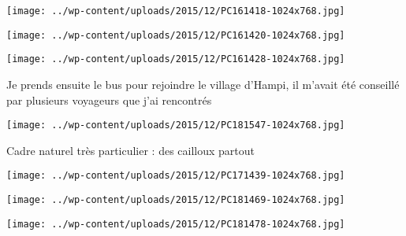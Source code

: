  

 

\begin{center} \texttt{[image: ../wp-content/uploads/2015/12/PC161418-1024x768.jpg]} \end{center}

 

 

\begin{center} \texttt{[image: ../wp-content/uploads/2015/12/PC161420-1024x768.jpg]} \end{center}

 

 

\begin{center} \texttt{[image: ../wp-content/uploads/2015/12/PC161428-1024x768.jpg]} \end{center}

 

 Je prends ensuite le bus pour rejoindre le village d'Hampi, il m'avait été conseillé par plusieurs voyageurs que j'ai rencontrés 

 

\begin{center} \texttt{[image: ../wp-content/uploads/2015/12/PC181547-1024x768.jpg]} \end{center}

 

 Cadre naturel très particulier : des cailloux partout 

 

\begin{center} \texttt{[image: ../wp-content/uploads/2015/12/PC171439-1024x768.jpg]} \end{center}

 

 

\begin{center} \texttt{[image: ../wp-content/uploads/2015/12/PC181469-1024x768.jpg]} \end{center}

 

 

\begin{center} \texttt{[image: ../wp-content/uploads/2015/12/PC181478-1024x768.jpg]} \end{center}

 

 

